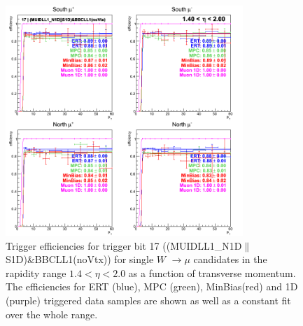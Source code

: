 \begin{figure}[h!]

  \centering

  \includegraphics[width=0.8\textwidth]{./figures/run13_trigeffipt_eta1_trig17_lin.png}
  \caption{\label{fig:run13_trigeffipt_eta1_nper0_trig17_lin} Trigger efficiencies for trigger bit 17 ((MUIDLL1\_N1D$\|$S1D)\&BBCLL1(noVtx)) for single $W$ $\rightarrow \mu$ candidates in the rapidity range $ 1.4 < \eta < 2.0$ as a function of transverse momentum. The efficiencies for ERT (blue), MPC (green), MinBias(red) and 1D (purple) triggered data samples are shown as well as a constant fit over the whole range.}

\end{figure}
\clearpage
